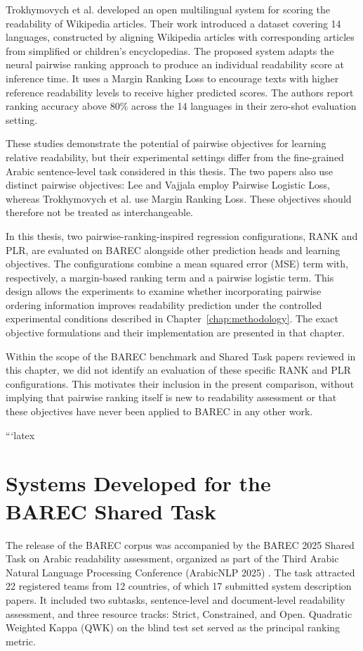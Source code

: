 \documentclass[12pt]{report}
\begin{document}
Trokhymovych et al. \cite{trokhymovych2024open} developed an open multilingual system for scoring the readability of Wikipedia articles. Their work introduced a dataset covering 14 languages, constructed by aligning Wikipedia articles with corresponding articles from simplified or children's encyclopedias. The proposed system adapts the neural pairwise ranking approach to produce an individual readability score at inference time. It uses a Margin Ranking Loss to encourage texts with higher reference readability levels to receive higher predicted scores. The authors report ranking accuracy above 80\% across the 14 languages in their zero-shot evaluation setting.

These studies demonstrate the potential of pairwise objectives for learning relative readability, but their experimental settings differ from the fine-grained Arabic sentence-level task considered in this thesis. The two papers also use distinct pairwise objectives: Lee and Vajjala employ Pairwise Logistic Loss, whereas Trokhymovych et al. use Margin Ranking Loss. These objectives should therefore not be treated as interchangeable.

In this thesis, two pairwise-ranking-inspired regression configurations, RANK and PLR, are evaluated on BAREC alongside other prediction heads and learning objectives. The configurations combine a mean squared error (MSE) term with, respectively, a margin-based ranking term and a pairwise logistic term. This design allows the experiments to examine whether incorporating pairwise ordering information improves readability prediction under the controlled experimental conditions described in Chapter~\ref{chap:methodology}. The exact objective formulations and their implementation are presented in that chapter.

Within the scope of the BAREC benchmark and Shared Task papers reviewed in this chapter, we did not identify an evaluation of these specific RANK and PLR configurations. This motivates their inclusion in the present comparison, without implying that pairwise ranking itself is new to readability assessment or that these objectives have never been applied to BAREC in any other work.


```latex
\section{Systems Developed for the BAREC Shared Task}
\label{sec:barec-systems}

The release of the BAREC corpus was accompanied by the BAREC 2025 Shared Task on Arabic readability assessment, organized as part of the Third Arabic Natural Language Processing Conference (ArabicNLP 2025) \cite{elmadani2025sharedtask}. The task attracted 22 registered teams from 12 countries, of which 17 submitted system description papers. It included two subtasks, sentence-level and document-level readability assessment, and three resource tracks: Strict, Constrained, and Open. Quadratic Weighted Kappa (QWK) on the blind test set served as the principal ranking metric.
\end{document}
